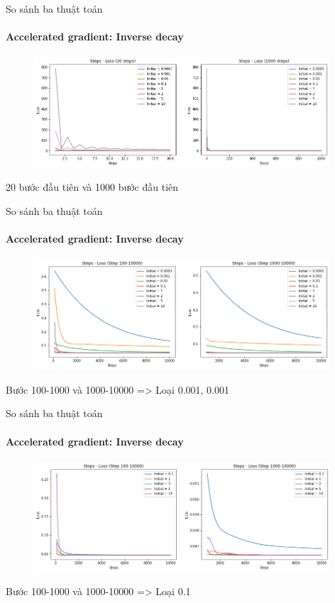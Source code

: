 \documentclass[10pt]{beamer}
\theoremstyle{remark}
\theoremstyle{definition}
\begin{document}
\begin{frame}{So sánh ba thuật toán}
	\framesubtitle{Accelerated gradient: Inverse decay}
	\begin{figure}[h!]
		\centering
		\includegraphics[width=11cm]{Thinh/19.png}
	\end{figure}
	20 bước đầu tiên và 1000 bước đầu tiên
\end{frame}

\begin{frame}{So sánh ba thuật toán}
	\framesubtitle{Accelerated gradient: Inverse decay}
	\begin{figure}[h!]
		\centering
		\includegraphics[width=11cm]{Thinh/20.png}
	\end{figure}
	Bước 100-1000 và 1000-10000 => Loại 0.001, 0.001
\end{frame}

\begin{frame}{So sánh ba thuật toán}
	\framesubtitle{Accelerated gradient: Inverse decay}

	\begin{figure}[h!]
		\centering
		\includegraphics[width=11cm]{Thinh/21.png}
	\end{figure}
	Bước 100-1000 và 1000-10000 => Loại 0.1
\end{frame}
\end{document}
